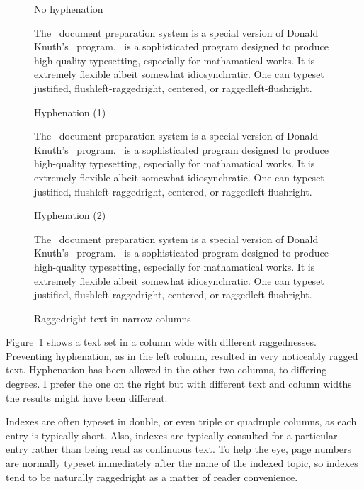 \documentclass[10pt,a4paper,oneside,extrafontsizes]{memoir}%
\begin{document}


\newlength{\rag}
  \setlength{\rag}{0.25\textwidth} %
  \addtolength{\rag}{10pt} 
  \addtolength{\rag}{9pt}  
\setlength{\rag}{107pt}
\newcommand{\ragtext}{%
The \ltx\ document preparation system is a special version of
Donald Knuth's \tx\ program. \tx\ is a sophisticated program
designed to produce high-quality typesetting, especially for
mathamatical works. It is extremely flexible albeit somewhat 
idiosynchratic. One can typeset justified, flushleft-raggedright,
centered, or raggedleft-flushright.}


\begin{figure}
\centering
\begin{minipage}[t]{\rag}
\raggedright
\noindent No hyphenation
\vspace{\onelineskip}

\parindent=15pt\indent \ragtext
\end{minipage}
\hfill
\begin{minipage}[t]{\rag}
\raggedyright
\noindent Hyphenation (1)
\vspace{\onelineskip}

\indent \ragtext
\end{minipage}
\hfill
\begin{minipage}[t]{\rag}
\raggedyright[1em]
\noindent Hyphenation (2)
\vspace{\onelineskip}

\indent \ragtext
\end{minipage}
\caption{Raggedright text in narrow columns} \label{fig:raggedright}
\end{figure}

\begin{paracol}{2}
\switchEng
    Figure~\ref{fig:raggedright} shows a text set in a column
\the\rag{} wide with 
different raggednesses. Preventing hyphenation, as in the left column, 
resulted in very noticeably ragged text. Hyphenation has been allowed
in the other two columns, to differing degrees. I prefer
the one on the right but with different text and column widths the results
might have been different.

    Indexes are often typeset in double, 
or even triple or quadruple columns,
as each entry is typically short. Also, indexes are typically 
consulted
for a particular entry rather than being read as continuous text. To help
the eye, page numbers are normally typeset immediately after the 
name of the indexed topic, so indexes tend to be 
naturally raggedright as a matter of reader 
convenience.
\end{paracol}
\end{document}
